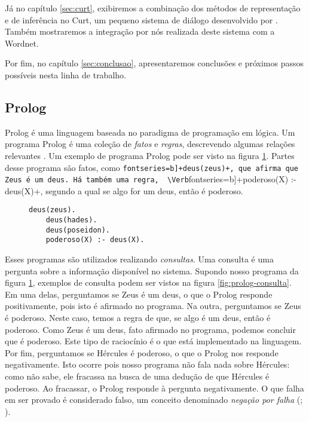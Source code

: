 
Já no capítulo \ref{sec:curt}, exibiremos a combinação dos métodos de representação e de inferência no Curt, um pequeno sistema de diálogo desenvolvido por \citet{BlackburnBos:2005}. Também mostraremos a integração por nós realizada deste sistema com a Wordnet.

Por fim, no capítulo \ref{sec:conclusao}, apresentaremos conclusões e próximos passos possíveis nesta linha de trabalho.

\subsection{Prolog}
\FloatBarrier
	Prolog é uma linguagem baseada no paradigma de programação em lógica.  Um programa Prolog é uma coleção de \textit{fatos} e \textit{regras}, descrevendo algumas relações relevantes \cite[p.~7]{prolog-learnnow}. Um exemplo de programa Prolog pode ser visto na figura \ref{fig:prolog-programa}. Partes desse programa são fatos, como \Verb[fontseries=b]+deus(zeus)+, que afirma que Zeus é um deus. Há também uma regra,  \Verb[fontseries=b]+poderoso(X) :- deus(X)+, segundo a qual se algo for um deus, então é poderoso.
	
	\begin{figure}
	\begin{Verbatim}[fontseries=b,gobble=1]
	deus(zeus). 
	deus(hades).
	deus(poseidon).
	poderoso(X) :- deus(X).
	\end{Verbatim}
	\caption{}
	\label{fig:prolog-programa}
	\end{figure}
	
	Esses programas são utilizados realizando \textit{consultas}. Uma consulta é uma pergunta sobre a informação disponível no sistema. Supondo nosso programa da figura \ref{fig:prolog-programa}, exemplos de consulta podem ser vistos na figura \ref{fig:prolog-consulta}. Em uma delas, perguntamos se Zeus é um deus, o que o Prolog responde positivamente, pois isto é afirmado no programa. Na outra, perguntamos se Zeus é poderoso. Neste caso, temos a regra de que, se algo é um deus, então é poderoso. Como Zeus é um deus, fato afirmado no programa, podemos concluir que é poderoso. Este tipo de raciocínio é o que está implementado na linguagem. Por fim, perguntamos se Hércules é poderoso, o que o Prolog nos responde negativamente. Isto ocorre pois nosso programa não fala nada sobre Hércules: como não sabe, ele fracassa na busca de uma dedução de que Hércules é poderoso. Ao fracassar, o Prolog responde à pergunta negativamente. O que falha em ser provado é considerado falso, um conceito denominado \textit{negação por falha} (\citealp[p.~113-115]{prolog-art}; \citealp[seção ~10.3]{prolog-learnnow}).
	
